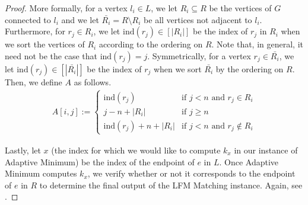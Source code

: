\documentclass[11pt]{article}
\newcommand{\am}{\textsf{Adaptive Minimum}\xspace}
\newcommand{\lfm}{\textsf{LFM Matching}\xspace}
\begin{document}
\begin{proof}
    More formally, for a vertex $l_i \in L$, we let $R_i \subseteq R$ be the vertices of $G$ connected to $l_i$ and we let $\bar{R_i} = R \setminus R_i$ be all vertices not adjacent to $l_i$. Furthermore, for $r_j \in R_i$, we let $\text{ind}(r_j) \in [|R_i|]$ be the index of $r_j$ in $R_i$ when we sort the vertices of $R_i$ according to the ordering on $R$. Note that, in general, it need not be the case that $\text{ind}(r_j) = j$. Symmetrically, for a vertex $r_j \in \bar{R_i}$, we let $\text{ind}(r_j) \in [|\bar{R_i}|]$ be the index of $r_j$ when we sort $\bar{R_i}$ by the ordering on $R$. Then, we define $A$ as follows.
    \begin{align*}
        A[i,j] := \begin{cases} \text{ind}(r_j) &\text{if $j < n$ and $r_j \in R_i$}\\
        j - n + |R_i| & \text{if $j \geq n$}\\
        \text{ind}(r_j) + n + |R_i|  & \text{if $j < n$ and $r_j \not \in R_i$}
        \end{cases}
    \end{align*}
    
    
    Lastly, let $x$ (the index for which we would like to compute $k_x$ in our instance of \am) be the index of the endpoint of $e$ in $L$.
    Once \am computes $k_x$, we verify whether or not it corresponds to the endpoint of $e$ in $R$ to determine the final output of the \lfm instance. Again, see .


\end{proof}
\end{document}
